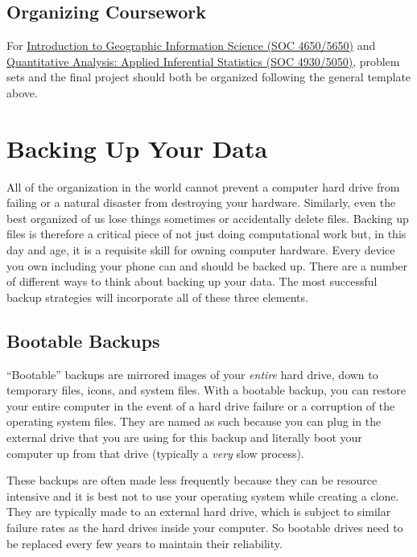 \documentclass[]{book}
\theoremstyle{definition}
\theoremstyle{definition}
\theoremstyle{definition}
\theoremstyle{remark}
\begin{document}
\subsection{Organizing Coursework}\label{organizing-coursework}

For \href{https://slu-soc5650.github.io}{Introduction to Geographic
Information Science (SOC 4650/5650)} and
\href{https://slu-soc5050.github.io}{Quantitative Analysis: Applied
Inferential Statistics (SOC 4930/5050)}, problem sets and the final
project should both be organized following the general template above.

\section{Backing Up Your Data}\label{backing-up-your-data}

All of the organization in the world cannot prevent a computer hard
drive from failing or a natural disaster from destroying your hardware.
Similarly, even the best organized of us lose things sometimes or
accidentally delete files. Backing up files is therefore a critical
piece of not just doing computational work but, in this day and age, it
is a requisite skill for owning computer hardware. Every device you own
including your phone can and should be backed up. There are a number of
different ways to think about backing up your data. The most successful
backup strategies will incorporate all of these three elements.

\subsection{Bootable Backups}\label{bootable-backups}

``Bootable'' backups are mirrored images of your \emph{entire} hard
drive, down to temporary files, icons, and system files. With a bootable
backup, you can restore your entire computer in the event of a hard
drive failure or a corruption of the operating system files. They are
named as such because you can plug in the external drive that you are
using for this backup and literally boot your computer up from that
drive (typically a \emph{very} slow process).

These backups are often made less frequently because they can be
resource intensive and it is best not to use your operating system while
creating a clone. They are typically made to an external hard drive,
which is subject to similar failure rates as the hard drives inside your
computer. So bootable drives need to be replaced every few years to
maintain their reliability.
\end{document}

